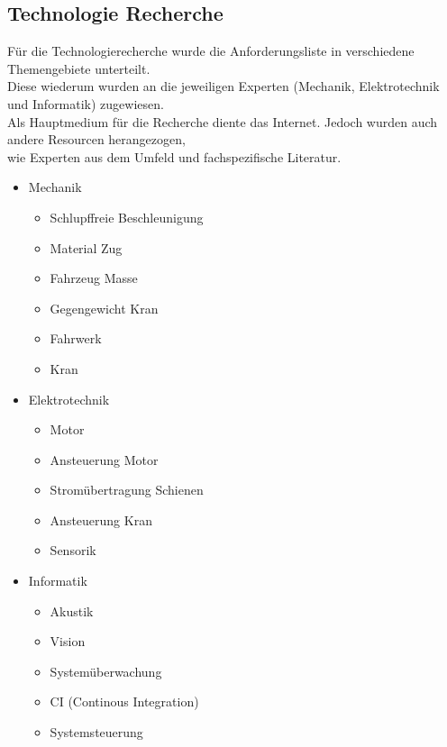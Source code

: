 \documentclass[../../../main.tex]{subfiles}
\begin{document}
\subsection{Technologie Recherche}
Für die Technologierecherche wurde die Anforderungsliste in verschiedene Themengebiete unterteilt. \\
Diese wiederum wurden an die jeweiligen Experten (Mechanik, Elektrotechnik und Informatik) zugewiesen. \\
Als Hauptmedium für die Recherche diente das Internet. Jedoch wurden auch andere Resourcen herangezogen, \\
wie Experten aus dem Umfeld und fachspezifische Literatur.

\begin{itemize}
    \item Mechanik
    \begin{itemize}
        \item Schlupffreie Beschleunigung
        \item Material Zug
        \item Fahrzeug Masse
        \item Gegengewicht Kran
        \item Fahrwerk
        \item Kran
    \end{itemize}
    \item Elektrotechnik
    \begin{itemize}
        \item Motor
        \item Ansteuerung Motor
        \item Stromübertragung Schienen
        \item Ansteuerung Kran
        \item Sensorik
      \end{itemize}
    \item Informatik
    \begin{itemize}
        \item Akustik
        \item Vision
        \item Systemüberwachung
        \item CI (Continous Integration)
        \item Systemsteuerung
    \end{itemize}
\end{itemize}
\end{document}
